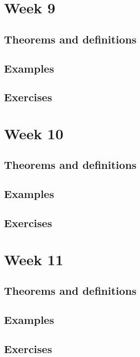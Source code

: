 \documentclass[12pt,a4paper]{article}
\begin{document}
\section{Week 9}
\subsection{Theorems and definitions}
\subsection{Examples}
\subsection{Exercises}
\section{Week 10}
\subsection{Theorems and definitions}
\subsection{Examples}
\subsection{Exercises}
\section{Week 11}
\subsection{Theorems and definitions}
\subsection{Examples}
\subsection{Exercises}
\end{document}
